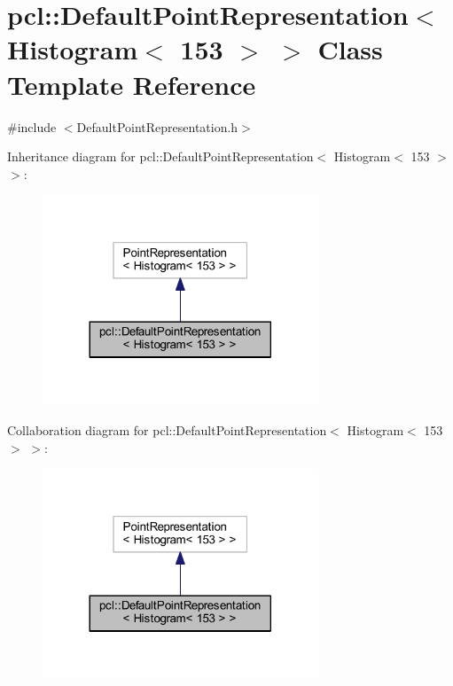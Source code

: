 \hypertarget{classpcl_1_1_default_point_representation_3_01_histogram_3_01153_01_4_01_4}{}\section{pcl\+:\+:Default\+Point\+Representation$<$ Histogram$<$ 153 $>$ $>$ Class Template Reference}
\label{classpcl_1_1_default_point_representation_3_01_histogram_3_01153_01_4_01_4}


{\ttfamily \#include $<$Default\+Point\+Representation.\+h$>$}



Inheritance diagram for pcl\+:\+:Default\+Point\+Representation$<$ Histogram$<$ 153 $>$ $>$\+:
\nopagebreak
\begin{figure}[H]
\begin{center}
\leavevmode
\includegraphics[width=233pt]{classpcl_1_1_default_point_representation_3_01_histogram_3_01153_01_4_01_4__inherit__graph}
\end{center}
\end{figure}


Collaboration diagram for pcl\+:\+:Default\+Point\+Representation$<$ Histogram$<$ 153 $>$ $>$\+:
\nopagebreak
\begin{figure}[H]
\begin{center}
\leavevmode
\includegraphics[width=233pt]{classpcl_1_1_default_point_representation_3_01_histogram_3_01153_01_4_01_4__coll__graph}
\end{center}
\end{figure}
